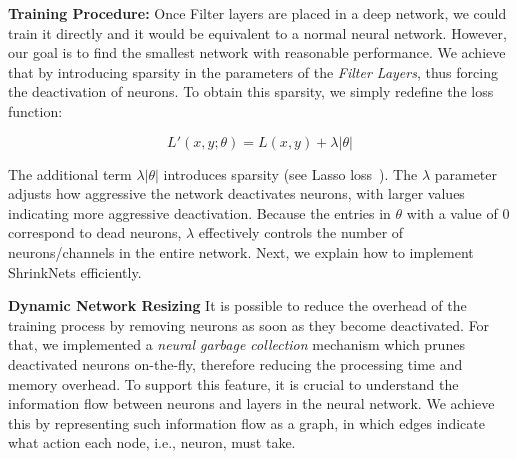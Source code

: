 \documentclass[sigconf]{acmart}
\newcommand{\gl}[1]{\textcolor{violet}{{\bf Gl:} #1}}
\begin{document}
\textbf{Training Procedure: } Once Filter layers are placed in a deep network, 
we could train it directly and it would be equivalent to a normal neural
network. However, our goal is to find the smallest network with reasonable
performance. We achieve that by introducing sparsity in the parameters of the
\textit{Filter Layers}, thus forcing the deactivation of neurons.
To obtain this sparsity, we simply redefine the loss function:

\begin{equation}
  L'(x,y;\theta) = L(x, y) + \lambda|\theta|
\end{equation}

The additional term $\lambda|\theta|$ introduces sparsity (see Lasso
loss~\cite{Tibshirani1996}).
The $\lambda$ parameter adjusts how aggressive the network deactivates neurons,
with larger values indicating more aggressive deactivation. 
Because the entries in $\theta$ with a value of $0$
correspond to dead neurons, $\lambda$ effectively controls the number of
neurons/channels in the entire network.  
Next, we explain how to implement
ShrinkNets efficiently.

\textbf{Dynamic Network Resizing}
It is possible to reduce the overhead of the training process by removing
neurons as soon as they become deactivated.
For that, we implemented a \emph{neural garbage collection} mechanism which
prunes deactivated neurons on-the-fly, therefore reducing the processing time
and memory overhead. To support this feature, it is crucial to understand the
information flow between neurons and layers in the neural network. We achieve
this by representing such information flow as a graph, in which edges indicate
what action each node, i.e., neuron, must take. 
\end{document}
